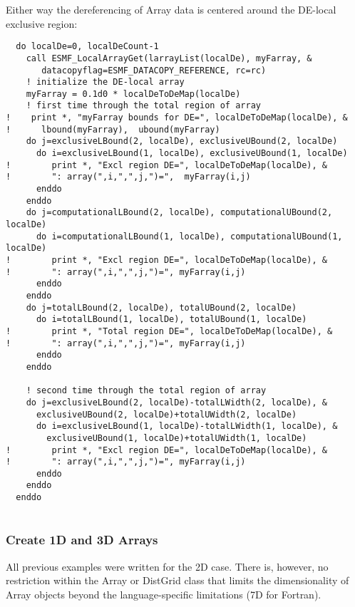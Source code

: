 
   Either way the dereferencing of Array data is centered around the DE-local
   exclusive region: 

 \begin{verbatim}
  do localDe=0, localDeCount-1
    call ESMF_LocalArrayGet(larrayList(localDe), myFarray, &
       datacopyflag=ESMF_DATACOPY_REFERENCE, rc=rc)
    ! initialize the DE-local array
    myFarray = 0.1d0 * localDeToDeMap(localDe)
    ! first time through the total region of array    
!    print *, "myFarray bounds for DE=", localDeToDeMap(localDe), &
!      lbound(myFarray),  ubound(myFarray)
    do j=exclusiveLBound(2, localDe), exclusiveUBound(2, localDe)
      do i=exclusiveLBound(1, localDe), exclusiveUBound(1, localDe)
!        print *, "Excl region DE=", localDeToDeMap(localDe), &
!        ": array(",i,",",j,")=",  myFarray(i,j)
      enddo
    enddo
    do j=computationalLBound(2, localDe), computationalUBound(2, localDe)
      do i=computationalLBound(1, localDe), computationalUBound(1, localDe)
!        print *, "Excl region DE=", localDeToDeMap(localDe), &
!        ": array(",i,",",j,")=", myFarray(i,j)
      enddo
    enddo
    do j=totalLBound(2, localDe), totalUBound(2, localDe)
      do i=totalLBound(1, localDe), totalUBound(1, localDe)
!        print *, "Total region DE=", localDeToDeMap(localDe), &
!        ": array(",i,",",j,")=", myFarray(i,j)
      enddo
    enddo

    ! second time through the total region of array    
    do j=exclusiveLBound(2, localDe)-totalLWidth(2, localDe), &
      exclusiveUBound(2, localDe)+totalUWidth(2, localDe)
      do i=exclusiveLBound(1, localDe)-totalLWidth(1, localDe), &
        exclusiveUBound(1, localDe)+totalUWidth(1, localDe)
!        print *, "Excl region DE=", localDeToDeMap(localDe), &
!        ": array(",i,",",j,")=", myFarray(i,j)
      enddo
    enddo
  enddo
 
\end{verbatim}
 

   \subsubsection{Create 1D and 3D Arrays}
  
   All previous examples were written for the 2D case. There is, however, no
   restriction within the Array or DistGrid class that limits the dimensionality
   of Array objects beyond the language-specific limitations (7D for Fortran).
  
